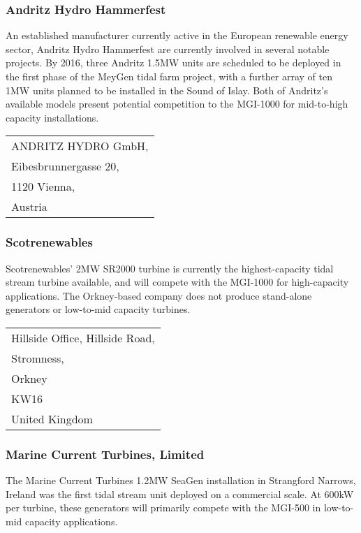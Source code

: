 \documentclass[a4paper,11pt]{article}
\begin{document}
\subsubsection{Andritz Hydro Hammerfest}
An established manufacturer currently active in the European renewable energy sector, Andritz Hydro Hammerfest  are currently involved in several notable projects. By 2016, three Andritz 1.5MW units are scheduled to be deployed in the first phase of the MeyGen tidal farm project, with a further array of ten 1MW units planned to be installed in the Sound of Islay\cite{r1}. Both of Andritz's available models present potential competition to the MGI-1000 for mid-to-high capacity installations.\\

\begin{tabular}{l}
ANDRITZ HYDRO GmbH,\\
Eibesbrunnergasse 20,\\
1120 Vienna,\\
Austria\\
\end{tabular}

\subsubsection{Scotrenewables}
Scotrenewables' 2MW SR2000 turbine is currently the highest-capacity tidal stream turbine available\cite{r2}, and will compete with the MGI-1000 for high-capacity applications. The Orkney-based company does not produce stand-alone generators or low-to-mid capacity turbines.\\

\begin{tabular}{l}
Hillside Office, Hillside Road, \\
Stromness, \\
Orkney\\
KW16\\
United Kingdom\\
\end{tabular}

\subsubsection{Marine Current Turbines, Limited}
The Marine Current Turbines 1.2MW SeaGen installation in Strangford Narrows, Ireland was the first tidal stream unit deployed on a commercial scale. At 600kW per turbine, these generators will primarily compete with the MGI-500 in low-to-mid capacity applications\cite{r3}.\\
\end{document}
